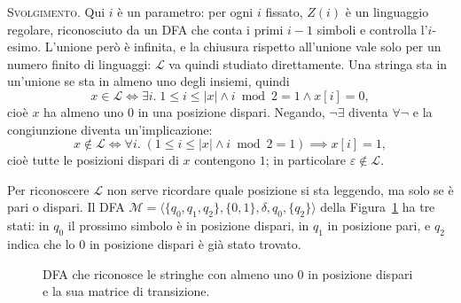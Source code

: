 \documentclass[a4paper, 11pt, oneside]{book}
\theoremstyle{formale}
\begin{document}
    \textsc{Svolgimento}. Qui $i$ \`e un parametro: per ogni $i$ fissato, $Z(i)$ \`e un
    linguaggio regolare, riconosciuto da un DFA che conta i primi $i - 1$ simboli e
    controlla l'$i$-esimo. L'unione per\`o \`e infinita, e la chiusura rispetto
    all'unione vale solo per un numero finito di linguaggi: $\mathcal{L}$ va quindi
    studiato direttamente. Una stringa sta in un'unione se sta in almeno uno degli
    insiemi, quindi
    \begin{equation*}
        x \in \mathcal{L} \iff \exists i.\; 1 \leq i \leq |x| \land i \bmod 2 = 1 \land
        x[i] = 0,
    \end{equation*}
    cio\`e $x$ ha almeno uno $0$ in una posizione dispari. Negando, $\neg\exists$ diventa
    $\forall \neg$ e la congiunzione diventa un'implicazione:
    \begin{equation*}
        x \notin \mathcal{L} \iff \forall i.\; (1 \leq i \leq |x| \land i \bmod 2 = 1)
        \implies x[i] = 1,
    \end{equation*}
    cio\`e tutte le posizioni dispari di $x$ contengono $1$; in particolare
    $\varepsilon \notin \mathcal{L}$.

    Per riconoscere $\mathcal{L}$ non serve ricordare quale posizione si sta leggendo, ma
    solo se \`e pari o dispari. Il DFA
    $\mathcal{M} = \langle \{q_0, q_1, q_2\}, \{0, 1\}, \delta, q_0, \{q_2\} \rangle$
    della Figura~\ref{fig:es-dispari} ha tre stati: in $q_0$ il prossimo simbolo \`e in
    posizione dispari, in $q_1$ in posizione pari, e $q_2$ indica che lo $0$ in posizione
    dispari \`e gi\`a stato trovato.

    \begin{figure}[H]
        \centering
        \caption{DFA che riconosce le stringhe con almeno uno $0$ in posizione dispari e
            la sua matrice di transizione.}
        \label{fig:es-dispari}
    \end{figure}
\end{document}
